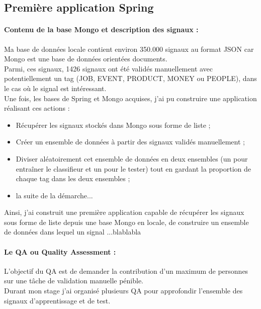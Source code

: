     \subsection{Première application Spring}
        \paragraph{Contenu de la base Mongo et description des signaux :}
            Ma base de données locale contient environ 350.000 signaux au format JSON car Mongo est une base de données orientées documents.\\
            Parmi, ces signaux, 1426 signaux ont été validés manuellement avec potentiellement un tag (JOB, EVENT, PRODUCT, MONEY ou PEOPLE), dans le cas où le signal est intéressant.\\
            Une fois, les bases de Spring et Mongo acquises, j'ai pu construire une application réalisant ces actions :
            \begin{itemize}
                \item Récupérer les signaux stockés dans Mongo sous forme de liste ;
                \item Créer un ensemble de données à partir des signaux validés manuellement ;
                \item Diviser aléatoirement cet ensemble de données en deux ensembles (un pour entraîner le classifieur et un pour le tester) tout en gardant la proportion de chaque tag dans les deux ensembles ;
                \item la suite de la démarche...
            \end{itemize}
        Ainsi, j'ai construit une première application capable de récupérer les signaux sous forme de liste depuis une base Mongo en locale, de construire un ensemble de données dans lequel un signal ...blablabla

        \paragraph{Le QA ou Quality Assessment :}
            L'objectif du QA est de demander la contribution d'un maximum de personnes sur une tâche de validation manuelle pénible.\\
            Durant mon stage j'ai organisé plusieurs QA pour approfondir l'ensemble des signaux d’apprentissage et de test.

